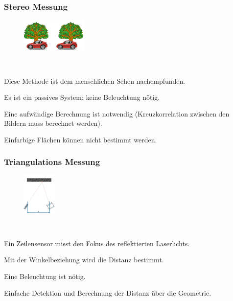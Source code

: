 \subsubsection{Stereo Messung}
\begin{figure}
    \vspace{-12pt}
    \centering
    \includegraphics[width=0.29\textwidth]{images/photonik_anwendung_stereo}
\end{figure}
\ 
\vspace{-5pt}
\begin{compactitem}
    \item Diese Methode ist dem menschlichen Sehen nachempfunden.
    \item Es ist ein passives System: keine Beleuchtung nötig.
    \item Eine aufwändige Berechnung ist notwendig (Kreuzkorrelation zwischen den Bildern muss berechnet werden).
    \item Einfarbige Flächen können nicht bestimmt werden.
\end{compactitem}

\subsubsection{Triangulations Messung}
\begin{figure}
    \vspace{-12pt}
    \centering
    \includegraphics[width=0.15\textwidth, angle=90]{images/photonik_anwendung_triangulation}
\end{figure}
\ 
\vspace{-5pt}
\begin{compactitem}
    \item Ein Zeilensensor misst den Fokus des reflektierten Laserlichts.
    \item Mit der Winkelbeziehung wird die Distanz bestimmt.
    \item Eine Beleuchtung ist nötig.
    \item Einfache Detektion und Berechnung der Distanz über die Geometrie.
\end{compactitem}

